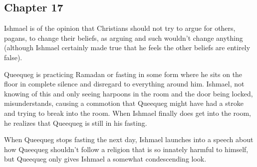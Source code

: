 \subsection{Chapter 17}

Ishmael is of the opinion that Christians should not try to argue for others,
pagans, to change their beliefs, as arguing and such wouldn't change anything
(although Ishmael certainly made true that he feels the other beliefs are
entirely false).

Queequeg is practicing Ramadan or fasting in some form where he sits on the
floor in complete silence and disregard to everything around him. Ishmael, not
knowing of this and only seeing harpoons in the room and the door being locked,
misunderstands, causing a commotion that Queequeg might have had a stroke and
trying to break into the room. When Ishmael finally does get into the room, he
realizes that Queequeg is still in his fasting.

When Queequeg stops fasting the next day, Ishmael launches into a speech about
how Queequeg shouldn't follow a religion that is so innately harmful to
himself, but Queequeg only gives Ishmael a somewhat condescending look.

